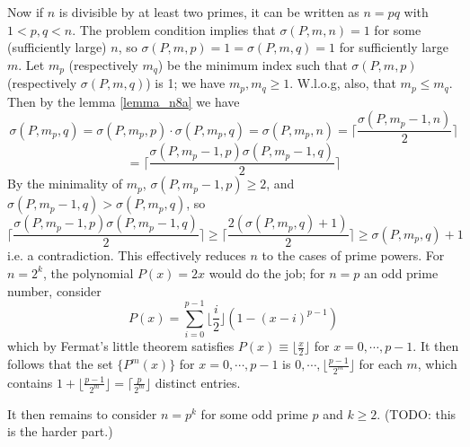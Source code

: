 \documentclass[11pt,a4paper]{article}
\begin{document}
\begin{enumerate}
        Now if $n$ is divisible by at least two primes, it can be written as $n=pq$ with $1<p, q<n$. 
        The problem condition implies that $\sigma(P, m, n)=1$ for some (sufficiently large) $n$, 
        so $\sigma(P, m, p)=1=\sigma(P, m, q)=1$ for sufficiently large $m$. 
        Let $m_p$ (respectively $m_q$) be the minimum index such that $\sigma(P, m, p)$ (respectively $\sigma(P, m, q)$) is 1; 
        we have $m_p, m_q\ge 1$. 
        W.l.o.g, also, that $m_p\le m_q$. 
        Then by the lemma \ref{lemma_n8a} we have 
        \[
        \sigma(P, m_p, q) = \sigma(P, m_p, p)\cdot \sigma(P, m_p, q)
        =\sigma(P, m_p, n)
        =\lceil\frac{\sigma(P, m_p - 1, n)}{2}\rceil
        \]\[
        =\lceil\frac{\sigma(P, m_p - 1, p) \sigma(P, m_p - 1, q)}{2}\rceil
        \]
        By the minimality of $m_p$, $\sigma(P, m_p - 1, p)\ge 2$, 
        and $\sigma(P, m_p - 1, q) > \sigma(P, m_p, q)$, so 
        \[
        \lceil\frac{\sigma(P, m_p - 1, p) \sigma(P, m_p - 1, q)}{2}\rceil
        \ge \lceil\frac{2( \sigma(P, m_p, q) + 1)}{2}\rceil
        \ge \sigma(P, m_p, q) + 1
        \]
        i.e. a contradiction. 
        This effectively reduces $n$ to the cases of prime powers. 
        For $n=2^k$, the polynomial $P(x)=2x$ would do the job; 
        for $n=p$ an odd prime number, 
        consider 
        \[
        P(x) = \sum_{i=0}^{p-1} \lfloor \frac{i}{2}\rfloor (1 - (x-i)^{p-1})
        \]
        which by Fermat's little theorem satisfies $P(x) \equiv \lfloor \frac{x}{2}\rfloor$ for $x=0, \cdots, p-1$. 
        It then follows that the set $\{P^m(x)\}$ for $x=0, \cdots, p-1$ is $0, \cdots, \lfloor \frac{p-1}{2^m}\rfloor$ for each $m$, which contains $1 + \lfloor\frac{p-1}{2^m}\rfloor = \lceil \frac{p}{2^m}\rfloor$ distinct entries. 
        
        It then remains to consider $n=p^k$ for some odd prime $p$ and $k\ge 2$. (TODO: this is the harder part.)
         
	\end{enumerate}
\end{document}
